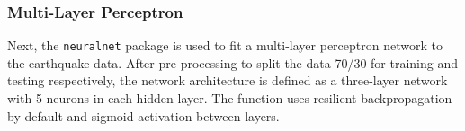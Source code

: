 
\subsubsection{Multi-Layer Perceptron}

Next, the \texttt{neuralnet} package \cite{neuralnet} is used to fit a multi-layer perceptron network to the earthquake data.  After pre-processing to split the data 70/30 for training and testing respectively, the network architecture is defined as a three-layer network with 5 neurons in each hidden layer.  The function uses resilient backpropagation by default and sigmoid activation between layers.

